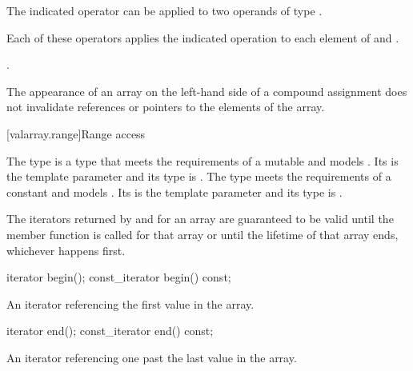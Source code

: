 \begin{itemdescr}
\pnum
\mandates
The indicated operator can be applied to two operands of type .

\pnum
\effects
Each of these operators applies the indicated operation to each element
of  and .

\pnum
\returns
{}.

\pnum
\remarks
The appearance of an array on the left-hand side of a compound assignment
does not
invalidate references or pointers to the elements of the array.
\end{itemdescr}

[valarray.range]{Range access}

\pnum
The  type
is a type that meets the requirements of a mutable
and models .
Its  is the template
parameter  and its  type is .
The  type meets the requirements of a constant
and models .
Its  is the template
parameter  and its  type is .

\pnum
The iterators returned by  and  for an array
are guaranteed to be valid until the member function
 is called for that
array or until the lifetime of that array ends, whichever happens
first.

%
\begin{itemdecl}
iterator begin();
const_iterator begin() const;
\end{itemdecl}

\begin{itemdescr}
\pnum
\returns
An iterator referencing the first value in the array.
\end{itemdescr}

%
\begin{itemdecl}
iterator end();
const_iterator end() const;
\end{itemdecl}

\begin{itemdescr}
\pnum
\returns
An iterator referencing one past the last value in the array.
\end{itemdescr}

